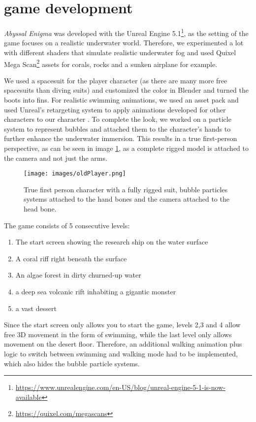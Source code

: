 \documentclass[letterpaper, 10 pt, conference]{ieeeconf}  %
\begin{document}
\section{game development}
\label{Sec:Game}
\textit{Abyssal Enigma} was developed with the Unreal Engine 5.1\footnote{\url{https://www.unrealengine.com/en-US/blog/unreal-engine-5-1-is-now-available}},
as the setting of the game focuses on a realistic underwater world.
Therefore, we experimented a lot with different shaders that simulate realistic underwater fog 
and used Quixel Mega Scan\footnote{\url{https://quixel.com/megascans}} assets for corals, rocks and a sunken airplane for example.

We used a spacesuit for the player character (as there are many more free spacesuits than diving suits) 
and customized the color in Blender and turned the boots into fins.
For realistic swimming animations, we used an asset pack and used Unreal's retargeting system to apply animations developed for other characters to our character \cite{retarget}.
To complete the look, we worked on a particle system to represent bubbles and attached them to the character's hands to further enhance the underwater immersion.
This results in a true first-person perspective, as can be seen in image \ref{fig:oldPlayer}, as a complete rigged model is attached to the camera and not just the arms.

\begin{figure}[!ht]
    \caption{True first person character with a fully rigged suit, bubble particles systems attached to the hand bones and the camera attached to the head bone.}
    \centering
    \texttt{[image: images/oldPlayer.png]}
    \label{fig:oldPlayer}
\end{figure}

The game consists of 5 consecutive levels:
\begin{enumerate}
    \item The start screen showing the research ship on the water surface
    \item A coral riff right beneath the surface
    \item An algae forest in dirty churned-up water
    \item a deep sea volcanic rift inhabiting a gigantic monster
    \item a vast dessert
\end{enumerate}

Since the start screen only allows you to start the game, levels 2,3 and 4 allow free 3D movement in the form of swimming, while the last level only allows movement on the desert floor.
Therefore, an additional walking animation plus logic to switch between swimming and walking mode had to be implemented, which also hides the bubble particle systems.
\end{document}
